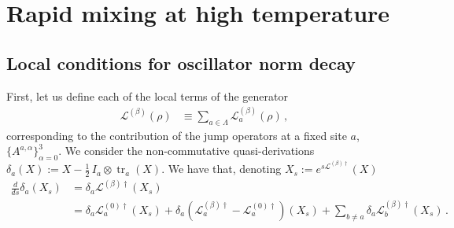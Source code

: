 \documentclass[aps,pra,amsmath,amssymb,twocolumn,10pt]{revtex4-2}
\theoremstyle{definition}
\begin{document}
\section{Rapid mixing at high temperature}\label{sec:highTgibbsrm}

\subsection{Local conditions for oscillator norm decay}

First, let us define each of the local terms of the generator
\begin{align}\label{eq:generator}
	\mathcal{L}^{(\beta)}(\rho)&
	\equiv \sum_{a\in\Lambda}\mathcal{L}^{(\beta)}_a(\rho)\,,
\end{align}
corresponding to the contribution of the jump operators at a fixed site $a$, $\{A^{a,\alpha}\}_{\alpha=0}^3$. We consider the non-commutative quasi-derivations $\delta_a(X):=X-\frac{1}{2}\,I_a\otimes \operatorname{tr}_a(X)$. We have that, denoting $X_s:=e^{s\mathcal{L}^{(\beta)\dagger}}(X)$
\begin{align}
	\frac{d}{ds}\delta_a (X_s)&=\delta_a\mathcal{L}^{(\beta)\dagger}(X_s)\\
	&=\delta_a \mathcal{L}^{(0)\dagger}_a(X_s)+\delta_a(\mathcal{L}^{(\beta)\dagger}_a-\mathcal{L}^{(0)\dagger}_a)(X_s)+\sum_{b\ne a}\delta_a\mathcal{L}_b^{(\beta)\dagger}(X_s)\,.
\end{align}
\end{document}
